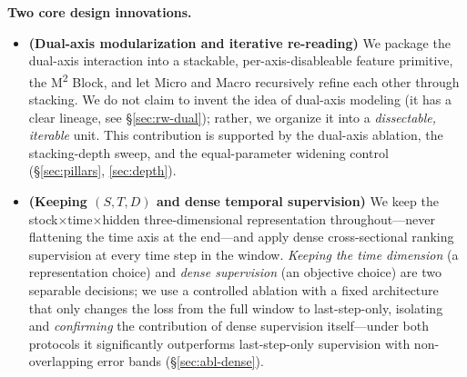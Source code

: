 \documentclass[a4paper,11pt]{article}
\newcommand{\msq}{\texorpdfstring{M\textsuperscript{2}}{M2}}             %
\begin{document}
\noindent\textbf{Two core design innovations.}
\begin{itemize}
  \item \textbf{(Dual-axis modularization and iterative re-reading)} We package
        the dual-axis interaction into a stackable, per-axis-disableable feature
        primitive, the \msq{} Block, and let Micro and Macro recursively refine
        each other through stacking. We do not claim to invent the idea of
        dual-axis modeling (it has a clear lineage, see \S\ref{sec:rw-dual});
        rather, we organize it into a \emph{dissectable, iterable} unit. This
        contribution is supported by the dual-axis ablation, the stacking-depth
        sweep, and the equal-parameter widening control (\S\ref{sec:pillars},
        \ref{sec:depth}).
  \item \textbf{(Keeping $(S,T,D)$ and dense temporal supervision)} We keep the
        stock$\times$time$\times$hidden three-dimensional representation
        throughout---never flattening the time axis at the end---and apply
        dense cross-sectional ranking supervision at every time step in the
        window. \emph{Keeping the time dimension} (a representation choice) and
        \emph{dense supervision} (an objective choice) are two separable
        decisions; we use a controlled ablation with a fixed architecture that
        only changes the loss from the full window to last-step-only, isolating
        and \emph{confirming} the contribution of dense supervision
        itself---under both protocols it significantly outperforms last-step-only
        supervision with non-overlapping error bands (\S\ref{sec:abl-dense}).
\end{itemize}
\end{document}
